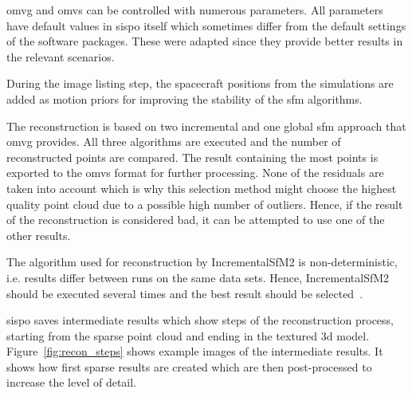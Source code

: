 \gls{omvg} and \gls{omvs} can be controlled with numerous parameters. All parameters have default values in \gls{sispo} itself which sometimes differ from the default settings of the software packages. These were adapted since they provide better results in the relevant scenarios.

During the image listing step, the spacecraft positions from the simulations are added as motion priors for improving the stability of the \gls{sfm} algorithms.

The reconstruction is based on two incremental and one global \gls{sfm} approach that \gls{omvg} provides. All three algorithms are executed and the number of reconstructed points are compared. The result containing the most points is exported to the \gls{omvs} format for further processing. None of the residuals are taken into account which is why this selection method might choose the highest quality point cloud due to a possible high number of outliers. Hence, if the result of the reconstruction is considered bad, it can be attempted to use one of the other results.

The algorithm used for reconstruction by IncrementalSfM2 is non-deterministic, i.e. results differ between runs on the same data sets. Hence, IncrementalSfM2 should be executed several times and the best result should be selected~\cite{Pajusalu2019CharacterizationMapping}.

\Gls{sispo} saves intermediate results which show steps of the reconstruction process, starting from the sparse point cloud and ending in the textured \gls{3d} model. Figure~\ref{fig:recon_steps} shows example images of the intermediate results. It shows how first sparse results are created which are then post-processed to increase the level of detail.


